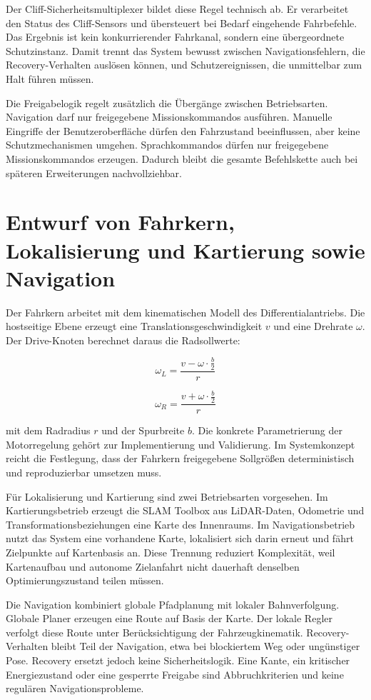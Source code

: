 Der Cliff-Sicherheitsmultiplexer bildet diese Regel technisch ab. Er verarbeitet den Status des Cliff-Sensors und übersteuert bei Bedarf eingehende Fahrbefehle. Das Ergebnis ist kein konkurrierender Fahrkanal, sondern eine übergeordnete Schutzinstanz. Damit trennt das System bewusst zwischen Navigationsfehlern, die Recovery-Verhalten auslösen können, und Schutzereignissen, die unmittelbar zum Halt führen müssen.

Die Freigabelogik regelt zusätzlich die Übergänge zwischen Betriebsarten. Navigation darf nur freigegebene Missionskommandos ausführen. Manuelle Eingriffe der Benutzeroberfläche dürfen den Fahrzustand beeinflussen, aber keine Schutzmechanismen umgehen. Sprachkommandos dürfen nur freigegebene Missionskommandos erzeugen. Dadurch bleibt die gesamte Befehlskette auch bei späteren Erweiterungen nachvollziehbar.

\section{Entwurf von Fahrkern, Lokalisierung und Kartierung sowie Navigation}

Der Fahrkern arbeitet mit dem kinematischen Modell des Differentialantriebs. Die hostseitige Ebene erzeugt eine Translationsgeschwindigkeit $v$ und eine Drehrate $\omega$. Der Drive-Knoten berechnet daraus die Radsollwerte:

$$\omega_L = \frac{v - \omega \cdot \frac{b}{2}}{r}$$

$$\omega_R = \frac{v + \omega \cdot \frac{b}{2}}{r}$$

mit dem Radradius $r$ und der Spurbreite $b$. Die konkrete Parametrierung der Motorregelung gehört zur Implementierung und Validierung. Im Systemkonzept reicht die Festlegung, dass der Fahrkern freigegebene Sollgrößen deterministisch und reproduzierbar umsetzen muss.

Für Lokalisierung und Kartierung sind zwei Betriebsarten vorgesehen. Im Kartierungsbetrieb erzeugt die SLAM Toolbox aus LiDAR-Daten, Odometrie und Transformationsbeziehungen eine Karte des Innenraums. Im Navigationsbetrieb nutzt das System eine vorhandene Karte, lokalisiert sich darin erneut und fährt Zielpunkte auf Kartenbasis an. Diese Trennung reduziert Komplexität, weil Kartenaufbau und autonome Zielanfahrt nicht dauerhaft denselben Optimierungszustand teilen müssen.

Die Navigation kombiniert globale Pfadplanung mit lokaler Bahnverfolgung. Globale Planer erzeugen eine Route auf Basis der Karte. Der lokale Regler verfolgt diese Route unter Berücksichtigung der Fahrzeugkinematik. Recovery-Verhalten bleibt Teil der Navigation, etwa bei blockiertem Weg oder ungünstiger Pose. Recovery ersetzt jedoch keine Sicherheitslogik. Eine Kante, ein kritischer Energiezustand oder eine gesperrte Freigabe sind Abbruchkriterien und keine regulären Navigationsprobleme.


